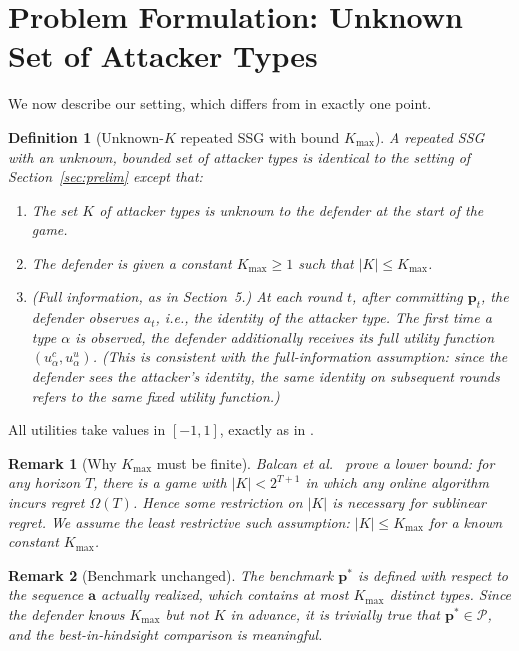 \documentclass[11pt]{article}
\newtheorem{definition}{Definition}
\newtheorem{remark}{Remark}
\newcommand{\pvec}{\mathbf{p}}
\newcommand{\avec}{\mathbf{a}}
\newcommand{\cP}{\mathcal{P}}
\newcommand{\Kmax}{K_{\max}}
\begin{document}
\section{Problem Formulation: Unknown Set of Attacker Types}
\label{sec:problem}

We now describe our setting, which differs from \cite{balcan2015} in exactly one point.

\begin{definition}[Unknown-$K$ repeated SSG with bound $\Kmax$]
A repeated SSG with an unknown, bounded set of attacker types is identical to the setting of Section~\ref{sec:prelim} except that:
\begin{enumerate}
  \item The set $K$ of attacker types is \emph{unknown} to the defender at the start of the game.
  \item The defender is given a constant $\Kmax \ge 1$ such that $|K| \le \Kmax$.
  \item (Full information, as in \cite{balcan2015} Section~5.) At each round $t$, after committing $\pvec_t$, the defender observes $a_t$, i.e., the identity of the attacker type. The \emph{first} time a type $\alpha$ is observed, the defender additionally receives its full utility function $(u_\alpha^c, u_\alpha^u)$. (This is consistent with the full-information assumption: since the defender sees the attacker's identity, the same identity on subsequent rounds refers to the same fixed utility function.)
\end{enumerate}
\end{definition}

All utilities take values in $[-1,1]$, exactly as in \cite[Section~2]{balcan2015}.

\begin{remark}[Why $\Kmax$ must be finite]
Balcan et al.\ \cite[Theorem~7.1]{balcan2015} prove a lower bound: for any horizon $T$, there is a game with $|K| < 2^{T+1}$ in which any online algorithm incurs regret $\Omega(T)$. Hence \emph{some} restriction on $|K|$ is necessary for sublinear regret. We assume the least restrictive such assumption: $|K| \le \Kmax$ for a known constant $\Kmax$.
\end{remark}

\begin{remark}[Benchmark unchanged]
The benchmark $\pvec^{*}$ is defined with respect to the sequence $\avec$ actually realized, which contains at most $\Kmax$ distinct types. Since the defender knows $\Kmax$ but not $K$ in advance, it is trivially true that $\pvec^{*} \in \cP$, and the best-in-hindsight comparison is meaningful.
\end{remark}
\end{document}

